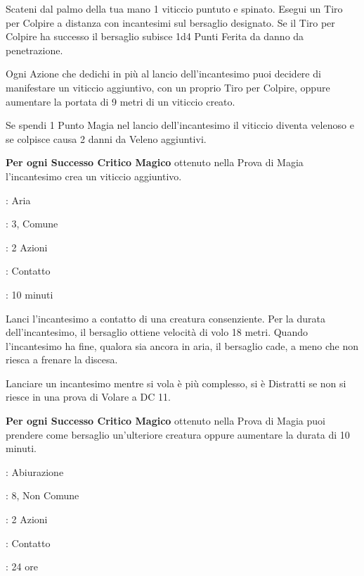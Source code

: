 \begin{multicols}{2}
Scateni dal palmo della tua mano 1 viticcio puntuto e spinato. Esegui un Tiro per Colpire a distanza con incantesimi sul bersaglio designato.
Se il Tiro per Colpire ha successo il bersaglio subisce 1d4 Punti Ferita da danno da penetrazione.

Ogni Azione che dedichi in più al lancio dell'incantesimo puoi decidere di manifestare un viticcio aggiuntivo, con un proprio Tiro per Colpire, oppure aumentare la portata di 9 metri di un viticcio creato.

Se spendi 1 Punto Magia nel lancio dell'incantesimo il viticcio diventa velenoso e se colpisce causa 2 danni da Veleno aggiuntivi.

\textbf{Per ogni Successo Critico Magico} ottenuto nella Prova di Magia l'incantesimo crea un viticcio aggiuntivo.

\noindent\colorbox{OBSSgold!10}{
\begin{minipage}{0.95\linewidth}
\begin{description}[noitemsep, topsep=0pt, parsep=0pt, partopsep=0pt, leftmargin=0cm, labelwidth=1.3cm]
	\item[\textbf{Lista}]: Aria
	\item[\textbf{Livello}]: 3, Comune
	\item[\textbf{Lancio}]: 2 Azioni
	\item[\textbf{Gittata}]: Contatto
	\item[\textbf{Durata}]: 10 minuti
\end{description}
\end{minipage}}\smallskip

Lanci l'incantesimo a contatto di una creatura consenziente. Per la durata dell'incantesimo, il bersaglio ottiene velocità di volo 18 metri. Quando l'incantesimo ha fine, qualora sia ancora in aria, il bersaglio cade, a meno che non riesca a frenare la discesa.

Lanciare un incantesimo mentre si vola è più complesso, si è Distratti se non si riesce in una prova di Volare a DC 11.

\textbf{Per ogni Successo Critico Magico} ottenuto nella Prova di Magia puoi prendere come bersaglio un'ulteriore creatura oppure aumentare la durata di 10 minuti.

\noindent\colorbox{OBSSgold!10}{
\begin{minipage}{0.95\linewidth}
\begin{description}[noitemsep, topsep=0pt, parsep=0pt, partopsep=0pt, leftmargin=0cm, labelwidth=1.3cm]
	\item[\textbf{Lista}]: Abiurazione
	\item[\textbf{Livello}]: 8, Non Comune
	\item[\textbf{Lancio}]: 2 Azioni
	\item[\textbf{Gittata}]: Contatto
	\item[\textbf{Durata}]: 24 ore
\end{description}
\end{minipage}}\smallskip


\end{multicols}
